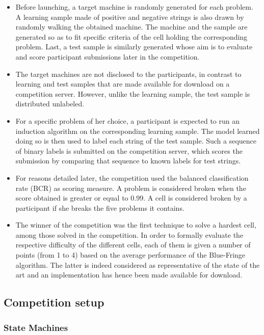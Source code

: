 \begin{itemize}
\item Before launching, a target machine is randomly generated for each problem. A learning sample made of positive and negative strings is also drawn by randomly walking the obtained machine. The machine and the sample are generated so as to fit specific criteria of the cell holding the corresponding problem. Last, a test sample is similarly generated whose aim is to evaluate and score participant submissions later in the competition.
\item The target machines are not disclosed to the participants, in contrast to learning and test samples that are made available for download on a competition server. However, unlike the learning sample, the test sample is distributed unlabeled. 
\item For a specific problem of her choice, a participant is expected to run an induction algorithm on the corresponding learning sample. The model learned doing so is then used to label each string of the test sample. Such a sequence of binary labels is submitted on the competition server, which scores the submission by comparing that sequence to known labels for test strings. 
\item For reasons detailed later, the competition used the balanced classification rate (BCR) as scoring measure. A problem is considered broken when the score obtained is greater or equal to 0.99. A cell is considered broken by a participant if she breaks the five problems it contains. 
\item The winner of the competition was the first technique to solve a hardest cell, among those solved in the competition. In order to formally evaluate the respective difficulty of the different cells, each of them is given a number of points (from 1 to 4) based on the average performance of the Blue-Fringe algorithm. The latter is indeed considered as representative of the state of the art and an implementation has hence been made available for download. 
\end{itemize}

\subsection{Competition setup\label{subsection_stamina_setup}}

\subsubsection{State Machines}

